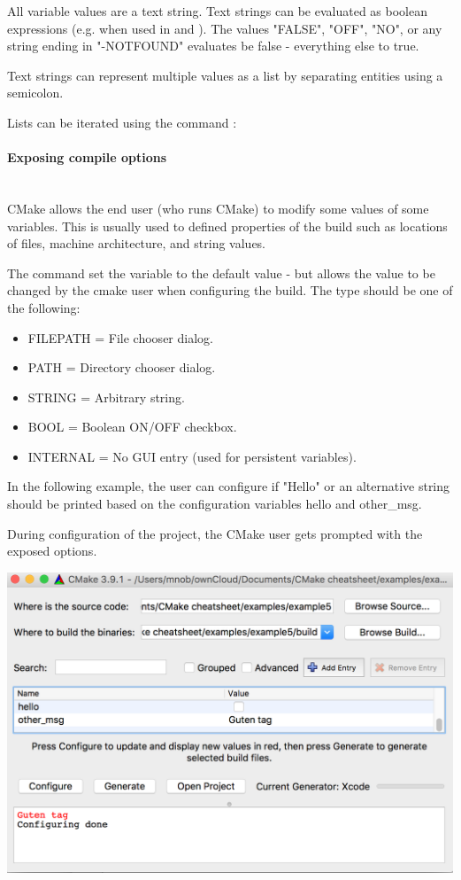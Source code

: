 \documentclass[11pt,a4paper,landscape]{scrartcl} %
\newcommand{\sectiontitle}[1]{\paragraph{#1} \ \\} %
\begin{document}
\begin{multicols}{2}
All variable values are a text string. Text strings can be evaluated as boolean expressions (e.g. when used in  and ). The values "FALSE", "OFF", "NO", or any string ending in "-NOTFOUND" evaluates be false - everything else to true.

Text strings can represent multiple values as a list by separating entities using a semicolon.



Lists can be iterated using the command :


			
\sectiontitle{Exposing compile options}
			
CMake allows the end user (who runs CMake) to modify some values of some variables.  This is usually used to defined properties of the build such as locations of files, machine architecture, and string values.

The command  set the variable to the default value - but allows the value to be changed by the cmake user when configuring the build. The type should be one of the following:

\begin{itemize}  
\item FILEPATH = File chooser dialog.
\item PATH     = Directory chooser dialog.
\item STRING   = Arbitrary string.
\item BOOL     = Boolean ON/OFF checkbox.
\item INTERNAL = No GUI entry (used for persistent variables).
\end{itemize}

In the following example, the user can configure if "Hello" or an alternative string should be printed based on the configuration variables hello and other\_msg.
 


During configuration of the project, the CMake user gets prompted with the exposed options.

\includegraphics[width=\columnwidth]{variable-options}


\end{multicols}
\end{document}
